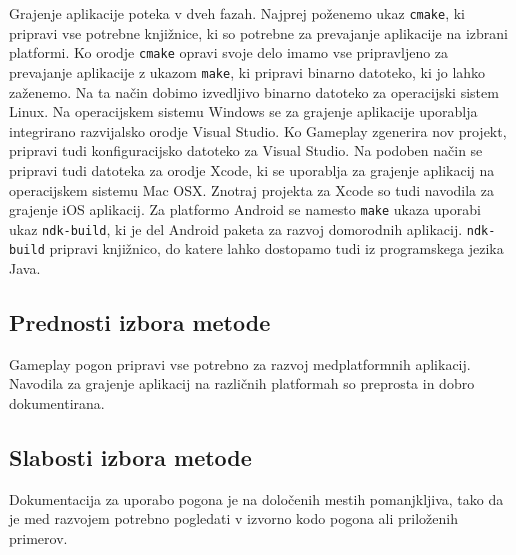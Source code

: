 Grajenje aplikacije poteka v dveh fazah. Najprej poženemo ukaz \texttt{cmake}, ki pripravi vse potrebne knjižnice, ki so potrebne za prevajanje aplikacije na izbrani platformi. Ko orodje \texttt{cmake} opravi svoje delo imamo vse pripravljeno za prevajanje aplikacije z ukazom \texttt{make}, ki pripravi binarno datoteko, ki jo lahko zaženemo. Na ta način dobimo izvedljivo binarno datoteko za operacijski sistem Linux. Na operacijskem sistemu Windows se za grajenje aplikacije uporablja integrirano razvijalsko orodje Visual Studio. Ko Gameplay zgenerira nov projekt, pripravi tudi konfiguracijsko datoteko za Visual Studio. Na podoben način se pripravi tudi datoteka za orodje Xcode, ki se uporablja za grajenje aplikacij na operacijskem sistemu Mac OSX. Znotraj projekta za Xcode so tudi navodila za grajenje iOS aplikacij. Za platformo Android se namesto \texttt{make} ukaza uporabi ukaz \texttt{ndk-build}, ki je del Android paketa za razvoj domorodnih aplikacij. \texttt{ndk-build} pripravi knjižnico, do katere lahko dostopamo tudi iz programskega jezika Java.  

\subsection{Prednosti izbora metode}

Gameplay pogon pripravi vse potrebno za razvoj medplatformnih aplikacij. Navodila za grajenje aplikacij na različnih platformah so preprosta in dobro dokumentirana.

\subsection{Slabosti izbora metode}

Dokumentacija za uporabo pogona je na določenih mestih pomanjkljiva, tako da je med razvojem potrebno pogledati v izvorno kodo pogona ali priloženih primerov. 






